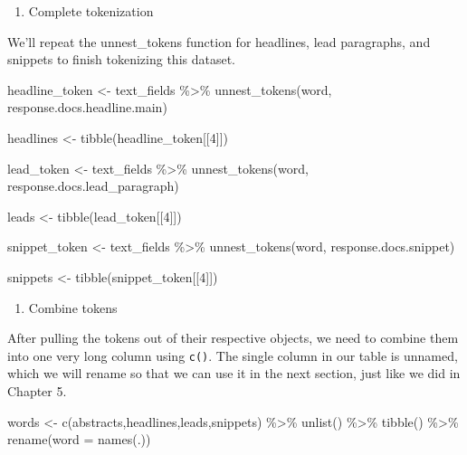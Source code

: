 \documentclass[
  krantz2]{krantz}
\makeatletter
\newenvironment{Shaded}{\begin{snugshade}}{\end{snugshade}}
\newcommand{\AttributeTok}[1]{\textcolor[rgb]{0.61,0.61,0.61}{#1}}
\newcommand{\DecValTok}[1]{\textcolor[rgb]{0.06,0.06,0.06}{#1}}
\newcommand{\FunctionTok}[1]{\textcolor[rgb]{0,0,0}{#1}}
\newcommand{\NormalTok}[1]{#1}
\newcommand{\OtherTok}[1]{\textcolor[rgb]{0.37,0.37,0.37}{#1}}
\newcommand{\SpecialCharTok}[1]{\textcolor[rgb]{0,0,0}{#1}}
\providecommand{\tightlist}{%
  \setlength{\itemsep}{0pt}\setlength{\parskip}{0pt}}
\newenvironment{kframe}{%
\medskip{}
\setlength{\fboxsep}{.8em}
 \def\at@end@of@kframe{}%
 \ifinner\ifhmode%
  \def\at@end@of@kframe{\end{minipage}}%
  \begin{minipage}{\columnwidth}%
 \fi\fi%
 \def\FrameCommand##1{\hskip\@totalleftmargin \hskip-\fboxsep
 \colorbox{shadecolor}{##1}\hskip-\fboxsep
     \hskip-\linewidth \hskip-\@totalleftmargin \hskip\columnwidth}%
 \MakeFramed {\advance\hsize-\width
   \@totalleftmargin\z@ \linewidth\hsize
   \@setminipage}}%
 {\par\unskip\endMakeFramed%
 \at@end@of@kframe}
\renewenvironment{Shaded}{\begin{kframe}}{\end{kframe}}
\makeatother
\begin{document}
\begin{enumerate}
\def\labelenumi{\arabic{enumi}.}
\setcounter{enumi}{2}
\tightlist
\item
  Complete tokenization
\end{enumerate}

We'll repeat the unnest\_tokens function for headlines, lead paragraphs, and snippets to finish tokenizing this dataset.

\begin{Shaded}
\begin{Highlighting}[]
\NormalTok{headline\_token }\OtherTok{\textless{}{-}}\NormalTok{ text\_fields }\SpecialCharTok{\%\textgreater{}\%}
  \FunctionTok{unnest\_tokens}\NormalTok{(word, response.docs.headline.main)}

\NormalTok{headlines }\OtherTok{\textless{}{-}} \FunctionTok{tibble}\NormalTok{(headline\_token[[}\DecValTok{4}\NormalTok{]])}

\NormalTok{lead\_token }\OtherTok{\textless{}{-}}\NormalTok{ text\_fields }\SpecialCharTok{\%\textgreater{}\%}
  \FunctionTok{unnest\_tokens}\NormalTok{(word, response.docs.lead\_paragraph)}

\NormalTok{leads }\OtherTok{\textless{}{-}} \FunctionTok{tibble}\NormalTok{(lead\_token[[}\DecValTok{4}\NormalTok{]])}

\NormalTok{snippet\_token }\OtherTok{\textless{}{-}}\NormalTok{ text\_fields }\SpecialCharTok{\%\textgreater{}\%}
  \FunctionTok{unnest\_tokens}\NormalTok{(word, response.docs.snippet)}

\NormalTok{snippets }\OtherTok{\textless{}{-}} \FunctionTok{tibble}\NormalTok{(snippet\_token[[}\DecValTok{4}\NormalTok{]])}
\end{Highlighting}
\end{Shaded}

\begin{enumerate}
\def\labelenumi{\arabic{enumi}.}
\setcounter{enumi}{3}
\tightlist
\item
  Combine tokens
\end{enumerate}

After pulling the tokens out of their respective objects, we need to combine them into one very long column using \texttt{c()}. The single column in our table is unnamed, which we will rename so that we can use it in the next section, just like we did in Chapter 5.

\begin{Shaded}
\begin{Highlighting}[]
\NormalTok{words }\OtherTok{\textless{}{-}} \FunctionTok{c}\NormalTok{(abstracts,headlines,leads,snippets) }\SpecialCharTok{\%\textgreater{}\%}
  \FunctionTok{unlist}\NormalTok{() }\SpecialCharTok{\%\textgreater{}\%}
  \FunctionTok{tibble}\NormalTok{() }\SpecialCharTok{\%\textgreater{}\%}
  \FunctionTok{rename}\NormalTok{(}\AttributeTok{word =} \FunctionTok{names}\NormalTok{(.))}
\end{Highlighting}
\end{Shaded}
\end{document}
